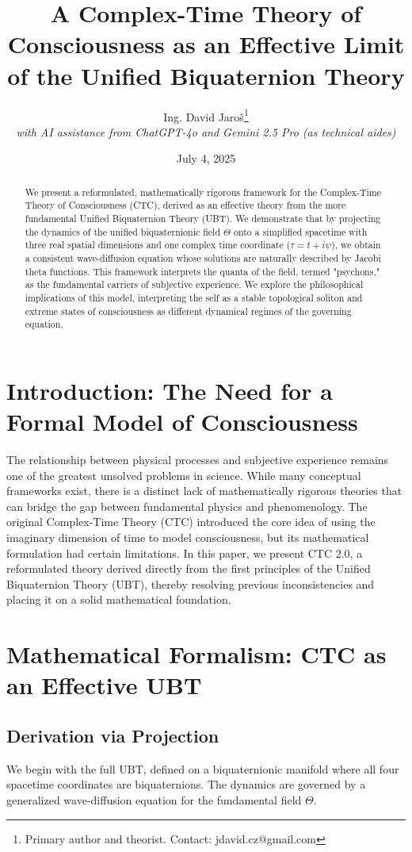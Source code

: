 \documentclass[12pt, a4paper]{article}
\title{\textbf{A Complex-Time Theory of Consciousness as an Effective Limit of the Unified Biquaternion Theory}}
\author{Ing. David Jaroš\thanks{Primary author and theorist. Contact: jdavid.cz@gmail.com} \\
\textit{with AI assistance from ChatGPT-4o and Gemini 2.5 Pro (as technical aides)}}
\date{July 4, 2025}
\begin{document}
\maketitle

\begin{abstract}
We present a reformulated, mathematically rigorous framework for the Complex-Time Theory of Consciousness (CTC), derived as an effective theory from the more fundamental Unified Biquaternion Theory (UBT). We demonstrate that by projecting the dynamics of the unified biquaternionic field \( \Theta \) onto a simplified spacetime with three real spatial dimensions and one complex time coordinate (\( \tau = t + i\psi \)), we obtain a consistent wave-diffusion equation whose solutions are naturally described by Jacobi theta functions. This framework interprets the quanta of the field, termed "psychons," as the fundamental carriers of subjective experience. We explore the philosophical implications of this model, interpreting the self as a stable topological soliton and extreme states of consciousness as different dynamical regimes of the governing equation.
\end{abstract}

\section{Introduction: The Need for a Formal Model of Consciousness}
The relationship between physical processes and subjective experience remains one of the greatest unsolved problems in science. While many conceptual frameworks exist, there is a distinct lack of mathematically rigorous theories that can bridge the gap between fundamental physics and phenomenology. The original Complex-Time Theory (CTC) introduced the core idea of using the imaginary dimension of time to model consciousness, but its mathematical formulation had certain limitations. In this paper, we present CTC 2.0, a reformulated theory derived directly from the first principles of the Unified Biquaternion Theory (UBT), thereby resolving previous inconsistencies and placing it on a solid mathematical foundation.

\section{Mathematical Formalism: CTC as an Effective UBT}
\subsection{Derivation via Projection}
We begin with the full UBT, defined on a biquaternionic manifold where all four spacetime coordinates are biquaternions. The dynamics are governed by a generalized wave-diffusion equation for the fundamental field \( \Theta \).
\end{document}
